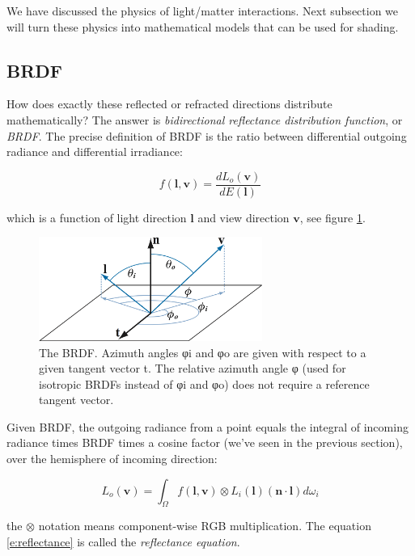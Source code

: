 We have discussed the physics of light/matter interactions. Next subsection we will turn these physics into mathematical models that can be used for shading.



\subsection{BRDF}
How does exactly these reflected or refracted directions distribute mathematically? The answer is \textit{bidirectional reflectance distribution function}, or \textit{BRDF}. The precise definition of BRDF is the ratio between differential outgoing radiance and differential irradiance:

\begin{equation}
	f(\mathbf{l},\mathbf{v})=\frac{dL_o(\mathbf{v})}{dE(\mathbf{l})}
\end{equation}

which is a function of light direction $\mathbf{l}$ and view direction $\mathbf{v}$, see figure \ref{f:brdf}. 

\begin{figure}
	\sidecaption
	\includegraphics[width=0.65\textwidth]{graphics/gi/ray-optics-7}
	\caption{The BRDF. Azimuth angles φi and φo are given with respect to a given tangent vector t. The relative azimuth angle φ (used for isotropic BRDFs instead of φi and φo) does not require a reference tangent vector.}
	\label{f:brdf}
\end{figure}

Given BRDF, the outgoing radiance from a point equals the integral of incoming radiance times BRDF times a cosine factor (we've seen in the previous section), over the hemisphere of incoming direction:

\begin{equation}\label{e:reflectance}
	L_o(\mathbf{v})=\int_{\Omega}f(\mathbf{l},\mathbf{v})\otimes L_i(\mathbf{l})(\mathbf{n}\cdot\mathbf{l})d\omega_i
\end{equation}

the $\otimes$ notation means component-wise RGB multiplication. The equation \ref{e:reflectance} is called the \textit{reflectance equation}.


